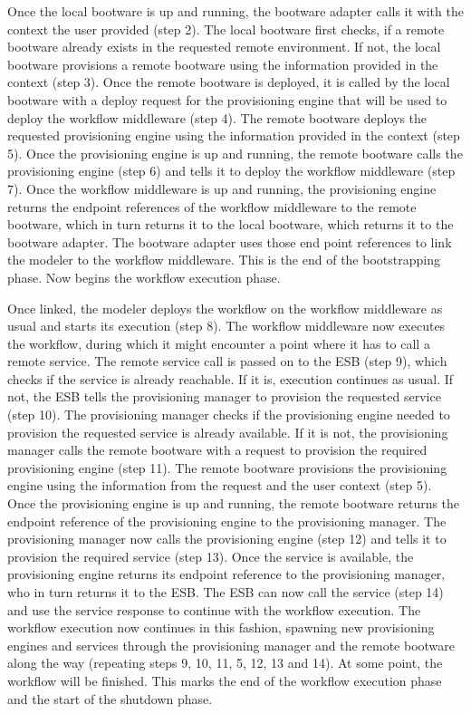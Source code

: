 Once the local bootware is up and running, the bootware adapter calls it with the context the user provided (step 2).
The local bootware first checks, if a remote bootware already exists in the requested remote environment.
If not, the local bootware provisions a remote bootware using the information provided in the context (step 3).
Once the remote bootware is deployed, it is called by the local bootware with a deploy request for the provisioning engine that will be used to deploy the workflow middleware (step 4).
The remote bootware deploys the requested provisioning engine using the information provided in the context (step 5).
Once the provisioning engine is up and running, the remote bootware calls the provisioning engine (step 6) and tells it to deploy the workflow middleware (step 7).
Once the workflow middleware is up and running, the provisioning engine returns the endpoint references of the workflow middleware to the remote bootware, which in turn returns it to the local bootware, which returns it to the bootware adapter.
The bootware adapter uses those end point references to link the modeler to the workflow middleware.
This is the end of the bootstrapping phase.
Now begins the workflow execution phase.

Once linked, the modeler deploys the workflow on the workflow middleware as usual and starts its execution (step 8).
The workflow middleware now executes the workflow, during which it might encounter a point where it has to call a remote service.
The remote service call is passed on to the ESB (step 9), which checks if the service is already reachable.
If it is, execution continues as usual.
If not, the ESB tells the provisioning manager to provision the requested service (step 10).
The provisioning manager checks if the provisioning engine needed to provision the requested service is already available.
If it is not, the provisioning manager calls the remote bootware with a request to provision the required provisioning engine (step 11).
The remote bootware provisions the provisioning engine using the information from the request and the user context (step 5).
Once the provisioning engine is up and running, the remote bootware returns the endpoint reference of the provisioning engine to the provisioning manager.
The provisioning manager now calls the provisioning engine (step 12) and tells it to provision the required service (step 13).
Once the service is available, the provisioning engine returns its endpoint reference to the provisioning manager, who in turn returns it to the ESB.
The ESB can now call the service (step 14) and use the service response to continue with the workflow execution.
The workflow execution now continues in this fashion, spawning new provisioning engines and services through the provisioning manager and the remote bootware along the way (repeating steps 9, 10, 11, 5, 12, 13 and 14).
At some point, the workflow will be finished.
This marks the end of the workflow execution phase and the start of the shutdown phase.

